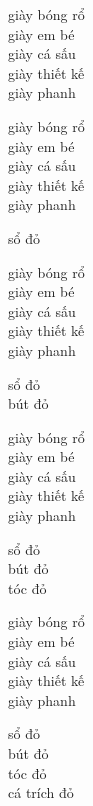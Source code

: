 \documentclass{article}
\begin{document}
\begin{huge}

giày bóng rổ\\
giày em bé\\
giày cá sấu \\
giày thiết kế \\
giày phanh


giày bóng rổ\\
giày em bé\\
giày cá sấu \\
giày thiết kế \\
giày phanh

sổ đỏ


giày bóng rổ\\
giày em bé\\
giày cá sấu \\
giày thiết kế \\
giày phanh

sổ đỏ\\
bút đỏ


giày bóng rổ\\
giày em bé\\
giày cá sấu \\
giày thiết kế \\
giày phanh

sổ đỏ\\
bút đỏ\\
tóc đỏ


giày bóng rổ\\
giày em bé\\
giày cá sấu \\
giày thiết kế \\
giày phanh

sổ đỏ\\
bút đỏ\\
tóc đỏ\\
cá trích đỏ



\end{huge}
\end{document}
